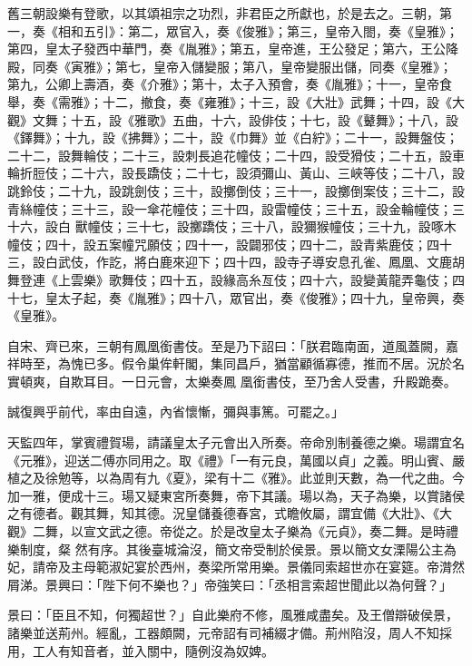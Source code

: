 \begin{pinyinscope}
 舊三朝設樂有登歌，以其頌祖宗之功烈，非君臣之所獻也，於是去之。三朝，第一，奏《相和五引》：第二，眾官入，奏《俊雅》；第三，皇帝入閤，奏《皇雅》；第四，皇太子發西中華門，奏《胤雅》；第五，皇帝進，王公發足；第六，王公降殿，同奏《寅雅》；第七，皇帝入儲變服；第八，皇帝變服出儲，同奏《皇雅》；
 第九，公卿上壽酒，奏《介雅》；第十，太子入預會，奏《胤雅》；十一，皇帝食舉，奏《需雅》；十二，撤食，奏《雍雅》；十三，設《大壯》武舞；十四，設《大觀》文舞；十五，設《雅歌》五曲，十六，設俳伎；十七，設《鼙舞》；十八，設《鐸舞》；十九，設《拂舞》；二十，設《巾舞》並《白紵》；二十一，設舞盤伎；二十二，設舞輪伎；二十三，設刺長追花幢伎；二十四，設受猾伎；二十五，設車輪折脰伎；二十六，設長蹻伎；二十七，設須彌山、黃山、三峽等伎；二十八，設跳鈴伎；二十九，設跳劍伎；三十，設擲倒伎；三十一，設擲倒案伎；三十二，設青絲幢伎；三十三，設一傘花幢伎；三十四，設雷幢伎；三十五，設金輪幢伎；三十六，設白
 獸幢伎；三十七，設擲蹻伎；三十八，設獮猴幢伎；三十九，設啄木幢伎；四十，設五案幢咒願伎；四十一，設闢邪伎；四十二，設青紫鹿伎；四十三，設白武伎，作訖，將白鹿來迎下；四十四，設寺子導安息孔雀、鳳凰、文鹿胡舞登連《上雲樂》歌舞伎；四十五，設緣高糸亙伎；四十六，設變黃龍弄龜伎；四十七，皇太子起，奏《胤雅》；四十八，眾官出，奏《俊雅》；四十九，皇帝興，奏《皇雅》。



 自宋、齊已來，三朝有鳳凰銜書伎。至是乃下詔曰：「朕君臨南面，道風蓋闕，嘉祥時至，為愧已多。假令巢侔軒閣，集同昌戶，猶當顧循寡德，推而不居。況於名實頓爽，自欺耳目。一日元會，太樂奏鳳
 凰銜書伎，至乃舍人受書，升殿跪奏。



 誠復興乎前代，率由自遠，內省懷慚，彌與事篤。可罷之。」



 天監四年，掌賓禮賀瑒，請議皇太子元會出入所奏。帝命別制養德之樂。瑒謂宜名《元雅》，迎送二傅亦同用之。取《禮》「一有元良，萬國以貞」之義。明山賓、嚴植之及徐勉等，以為周有九《夏》，梁有十二《雅》。此並則天數，為一代之曲。今加一雅，便成十三。瑒又疑東宮所奏舞，帝下其議。瑒以為，天子為樂，以賞諸侯之有德者。觀其舞，知其德。況皇儲養德春宮，式瞻攸屬，謂宜備《大壯》、《大觀》二舞，以宣文武之德。帝從之。於是改皇太子樂為《元貞》，奏二舞。是時禮樂制度，粲
 然有序。其後臺城淪沒，簡文帝受制於侯景。景以簡文女溧陽公主為妃，請帝及主母範淑妃宴於西州，奏梁所常用樂。景儀同索超世亦在宴筵。帝潸然屑涕。景興曰：「陛下何不樂也？」帝強笑曰：「丞相言索超世聞此以為何聲？」



 景曰：「臣且不知，何獨超世？」自此樂府不修，風雅咸盡矣。及王僧辯破侯景，諸樂並送荊州。經亂，工器頗闕，元帝詔有司補綴才備。荊州陷沒，周人不知採用，工人有知音者，並入關中，隨例沒為奴婢。




\end{pinyinscope}
